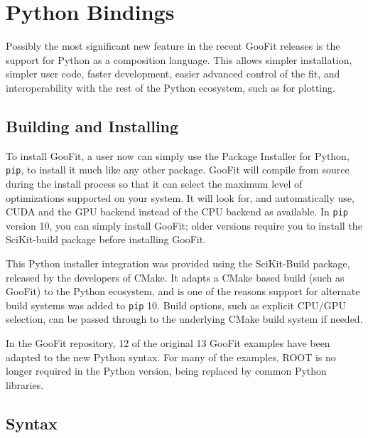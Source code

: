 \documentclass{webofc}
\begin{document}
\section{Python Bindings}
\label{sec-py}

Possibly the most significant new feature in the recent GooFit releases is the support for Python as a composition language. This allows simpler installation, simpler user code, faster development, easier advanced control of the fit, and interoperability with the rest of the Python ecosystem, such as for plotting.

\subsection{Building and Installing}

To install GooFit, a user now can simply use the Package Installer for Python, \texttt{pip}, to install it much like any other package. GooFit will compile from source during the install process so that it can select the maximum level of optimizations supported on your system. It will look for, and automatically use, CUDA and the GPU backend instead of the CPU backend as available. In \texttt{pip} version 10, you can simply install GooFit; older versions require you to install the SciKit-build package before installing GooFit.

This Python installer integration was provided using the SciKit-Build package, released by the developers of CMake. It adapts a CMake based build (such as GooFit) to the Python ecosystem, and is one of the reasons support for alternate build systems was added to \texttt{pip} 10. Build options, such as explicit CPU/GPU selection, can be passed through to the underlying CMake build system if needed.

In the GooFit repository, 12 of the original 13 GooFit examples have been  adapted to the new Python syntax. For many of the examples, ROOT is no longer required in the Python version, being replaced by common Python libraries.

\subsection{Syntax}
\end{document}
